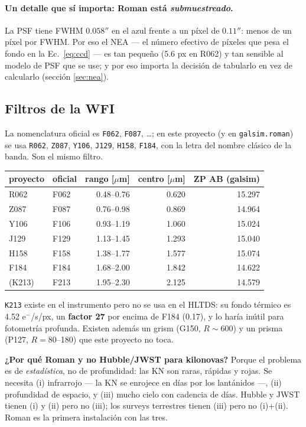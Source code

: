 \documentclass[11pt,a4paper]{article}
\newcommand{\code}[1]{\texttt{\small #1}}
\newlength{\examenpad}
\newenvironment{examen}
  {\par\medskip\noindent
   \begin{lrbox}{\examenbox}%
   \begin{minipage}{\dimexpr\linewidth-2\examenpad}\small}
  {\end{minipage}%
   \end{lrbox}%
   {\setlength{\fboxsep}{\examenpad}\colorbox{boxgray}{\usebox{\examenbox}}}%
   \par\medskip}
\begin{document}
\paragraph{Un detalle que sí importa: Roman está \emph{submuestreado}.} La PSF tiene FWHM
$0.058''$ en el azul frente a un píxel de $0.11''$: menos de un píxel por FWHM. Por eso el NEA
--- el número efectivo de píxeles que pesa el fondo en la Ec.\ \eqref{eq:ccd} --- es tan pequeño
(5.6 px en R062) y tan sensible al modelo de PSF que se use; y por eso importa la decisión de
tabularlo en vez de calcularlo (sección \ref{sec:nea}).

\subsection{Filtros de la WFI}
La nomenclatura oficial es \code{F062}, \code{F087}, \dots; en este proyecto (y en
\code{galsim.roman}) se usa \code{R062}, \code{Z087}, \code{Y106}, \code{J129}, \code{H158},
\code{F184}, con la letra del nombre clásico de la banda. Son el mismo filtro.

\begin{center}
\begin{tabular}{llrrr}
\toprule
proyecto & oficial & rango [$\mu$m] & centro [$\mu$m] & ZP AB (galsim) \\
\midrule
R062 & F062 & 0.48--0.76 & 0.620 & 15.297 \\
Z087 & F087 & 0.76--0.98 & 0.869 & 14.964 \\
Y106 & F106 & 0.93--1.19 & 1.060 & 15.024 \\
J129 & F129 & 1.13--1.45 & 1.293 & 15.040 \\
H158 & F158 & 1.38--1.77 & 1.577 & 15.074 \\
F184 & F184 & 1.68--2.00 & 1.842 & 14.622 \\
(K213) & F213 & 1.95--2.30 & 2.125 & 14.579 \\
\bottomrule
\end{tabular}
\end{center}

\code{K213} existe en el instrumento pero no se usa en el HLTDS: su fondo térmico es
4.52 e$^-$/s/px, un \textbf{factor 27} por encima de F184 (0.17), y lo haría inútil para fotometría
profunda. Existen además un grism (G150, $R\sim600$) y un prisma (P127, $R = 80$--180) que este
proyecto no toca.

\begin{examen}
\textbf{¿Por qué Roman y no Hubble/JWST para kilonovas?} Porque el problema es de
\emph{estadística}, no de profundidad: las KN son raras, rápidas y rojas. Se necesita (i) infrarrojo
--- la KN se enrojece en días por los lantánidos ---, (ii) profundidad de espacio, y (iii) mucho
cielo con cadencia de días. Hubble y JWST tienen (i) y (ii) pero no (iii); los surveys terrestres
tienen (iii) pero no (i)+(ii). Roman es la primera instalación con las tres.
\end{examen}
\end{document}
